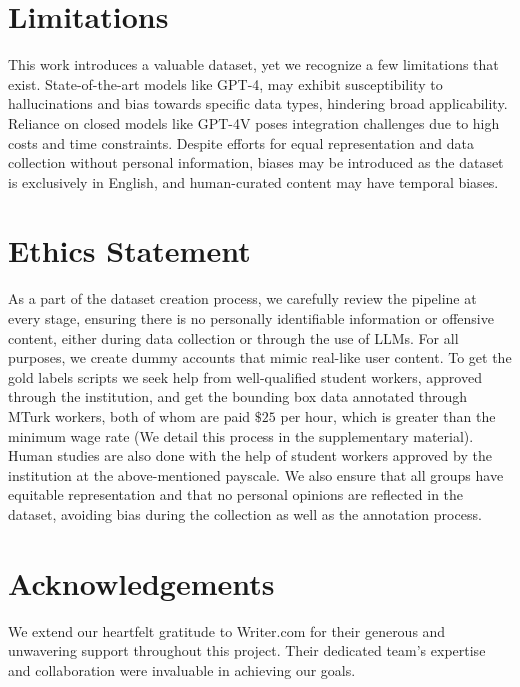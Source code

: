 \section{Limitations}

This work introduces a valuable dataset, yet we recognize a few limitations that exist. State-of-the-art models like GPT-4, may exhibit susceptibility to hallucinations and bias towards specific data types, hindering broad applicability. Reliance on closed models like GPT-4V poses integration challenges due to high costs and time constraints. Despite efforts for equal representation and data collection without personal information, biases may be introduced as the dataset is exclusively in English, and human-curated content may have temporal biases.

\section{Ethics Statement}
As a part of the dataset creation process, we carefully review the pipeline at every stage, ensuring there is no personally identifiable information or offensive content, either during data collection or through the use of LLMs. For all purposes, we create dummy accounts that mimic real-like user content. To get the gold labels scripts we seek help from well-qualified student workers, approved through the institution, and get the bounding box data annotated through MTurk workers, both of whom are paid $\$25$ per hour, which is greater than the minimum wage rate (We detail this process in the supplementary material). Human studies are also done with the help of student workers approved by the institution at the above-mentioned payscale. We also ensure that all groups have equitable representation and that no personal opinions are reflected in the dataset, avoiding bias during the collection as well as the annotation process.

\section*{Acknowledgements} We extend our heartfelt gratitude to Writer.com for their generous and unwavering support throughout this project. Their dedicated team's expertise and collaboration were invaluable in achieving our goals.

